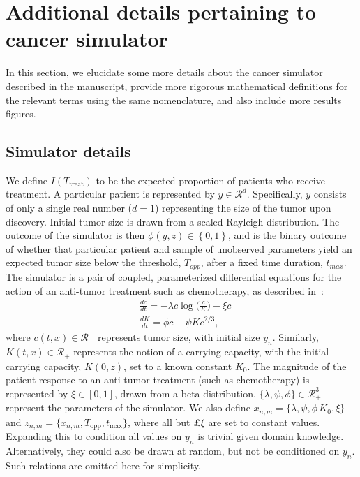 
\section{Additional details pertaining to cancer simulator}
\label{sec:cancer_sim_app}

In this section, we elucidate some more details about the cancer simulator described in the manuscript, provide more rigorous mathematical definitions for the relevant terms using the same nomenclature, and also include more results figures.

\subsection{Simulator details}
\label{sec:cancer_sim_details}

We define $I(T_{\text{treat}})$ to be the expected proportion of patients who receive treatment.
A particular patient is represented by $y\in\mathcal{R}^d$. Specifically, $y$ consists of only a single real number ($d=1$) representing the size of the tumor upon discovery. Initial tumor size is drawn from a scaled Rayleigh distribution.
The outcome of the simulator is then $\phi(y,z)\in\left\lbrace 0,1\right\rbrace $, and is the binary outcome of whether that particular patient and sample of unobserved parameters yield an expected tumor size below the threshold, $T_{opp}$, after a fixed time duration, $t_{max}$. The simulator is a pair of coupled, parameterized differential equations for the action of an anti-tumor treatment such as chemotherapy, as described in~\citet{enderling2014cancer}:
\begin{align}
&\frac{dc}{dt} = -\lambda c \log\big(\frac{c}{K}\big) - \xi c \\
&\frac{dK}{dt} = \phi c - \psi K c^{2/3},
\end{align}
where $c(t,x)\in\mathcal{R}_+$ represents tumor size, with initial size $y_n$.
Similarly, $K(t,x)\in\mathcal{R}_+$ represents the notion of a carrying capacity, with the initial carrying capacity, $K(0,z)$, set to a known constant $K_0$.
The magnitude of the patient response to an anti-tumor treatment (such as chemotherapy) is represented by $\xi\in[0,1]$, drawn from a beta distribution.
$\{\lambda, \psi, \phi\}\in\mathcal{R}_+^3$ represent the parameters of the simulator.
We also define $x _{n,m}= \{\lambda, \psi, \phi\, K_0, \xi\}$ and $z_{n,m}=\{x_{n,m}, T_{\text{opp}}, t_{\text{max}}\}$, where all but £$\xi$ are set to constant values. Expanding this to condition all values on $y_n$ is trivial given domain knowledge. Alternatively, they could also be drawn at random, but not be conditioned on $y_n$. Such relations are omitted here for simplicity.

